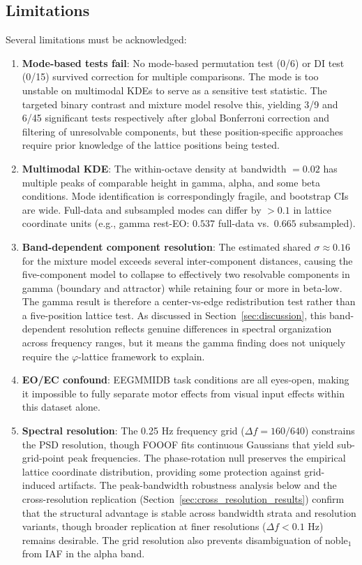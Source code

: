 \documentclass[11pt,a4paper]{article}
\newcommand{\phisym}{\varphi}
\begin{document}
\subsection{Limitations}
\label{sec:limitations}

Several limitations must be acknowledged:

\begin{enumerate}
    \item \textbf{Mode-based tests fail}: No mode-based permutation test (0/6) or DI test (0/15) survived correction for multiple comparisons. The mode is too unstable on multimodal KDEs to serve as a sensitive test statistic. The targeted binary contrast and mixture model resolve this, yielding 3/9 and 6/45 significant tests respectively after global Bonferroni correction and filtering of unresolvable components, but these position-specific approaches require prior knowledge of the lattice positions being tested.

    \item \textbf{Multimodal KDE}: The within-octave density at bandwidth $= 0.02$ has multiple peaks of comparable height in gamma, alpha, and some beta conditions. Mode identification is correspondingly fragile, and bootstrap CIs are wide. Full-data and subsampled modes can differ by $> 0.1$ in lattice coordinate units (e.g., gamma rest-EO: $0.537$ full-data vs.\ $0.665$ subsampled).

    \item \textbf{Band-dependent component resolution}: The estimated shared $\sigma \approx 0.16$ for the mixture model exceeds several inter-component distances, causing the five-component model to collapse to effectively two resolvable components in gamma (boundary and attractor) while retaining four or more in beta-low. The gamma result is therefore a center-vs-edge redistribution test rather than a five-position lattice test. As discussed in Section~\ref{sec:discussion}, this band-dependent resolution reflects genuine differences in spectral organization across frequency ranges, but it means the gamma finding does not uniquely require the $\phisym$-lattice framework to explain.

    \item \textbf{EO/EC confound}: EEGMMIDB task conditions are all eyes-open, making it impossible to fully separate motor effects from visual input effects within this dataset alone.

    \item \textbf{Spectral resolution}: The 0.25 Hz frequency grid ($\Delta f = 160/640$) constrains the PSD resolution, though FOOOF fits continuous Gaussians that yield sub-grid-point peak frequencies. The phase-rotation null preserves the empirical lattice coordinate distribution, providing some protection against grid-induced artifacts. The peak-bandwidth robustness analysis below and the cross-resolution replication (Section~\ref{sec:cross_resolution_results}) confirm that the structural advantage is stable across bandwidth strata and resolution variants, though broader replication at finer resolutions ($\Delta f < 0.1$ Hz) remains desirable. The grid resolution also prevents disambiguation of noble$_1$ from IAF in the alpha band.


\end{enumerate}
\end{document}
